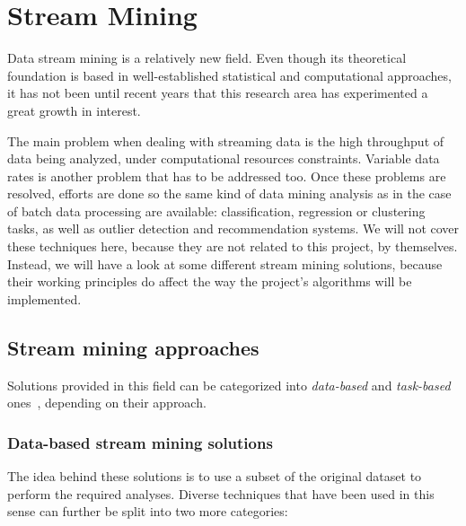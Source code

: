 \section{Stream Mining}
\label{Theory::StreamMining}

Data stream mining is a relatively new field. Even though its theoretical foundation is based in well-established statistical and computational approaches, it has not been until recent years that this research area has experimented a great growth in interest.

The main problem when dealing with streaming data is the high throughput of data being analyzed, under computational resources constraints. Variable data rates is another problem that has to be addressed too. Once these problems are resolved, efforts are done so the same kind of data mining analysis as in the case of batch data processing are available: classification, regression or clustering tasks, as well as outlier detection and recommendation systems. We will not cover these techniques here, because they are not related to this project, by themselves. Instead, we will have a look at some different stream mining solutions, because their working principles do affect the way the project’s algorithms will be implemented.

\subsection{Stream mining approaches}
\label{Theory::StreamMining::Approaches}

Solutions provided in this field can be categorized into \textit{data-based} and \textit{task-based} ones~\citep{Gaber:MiningDataStreamsReview}, depending on their approach.

\subsubsection*{Data-based stream mining solutions}

The idea behind these solutions is to use a subset of the original dataset to perform the required analyses. Diverse techniques that have been used in this sense can further be split into two more categories:

